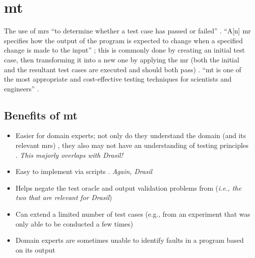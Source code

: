 \section[Metamorphic Testing (MT)]{\acf{mt}}
\label{chap:testing:sec:metamorphic-testing}
The use of \acfp{mr} ``to determine whether a test case has passed or failed''
\citep[p.~67]{KanewalaAndYuehChen2019}. ``A[n] \acs{mr} specifies how the
output of the program is expected to change when a specified change is made to
the input'' \citep[p.~67]{KanewalaAndYuehChen2019}; this is commonly done by
creating an initial test case, then transforming it into a new one by applying
the \acs{mr} (both the initial and the resultant test cases are executed and
should both pass) \citep[p.~68]{KanewalaAndYuehChen2019}. ``\acs{mt} is one of
the most appropriate and cost-effective testing techniques for scientists and
engineers'' \citep[p.~72]{KanewalaAndYuehChen2019}.

\subsection[Benefits of MT]{Benefits of \acs{mt}}
\begin{itemize}
    \item Easier for domain experts; not only do they understand the domain
          (and its relevant \acp{mr}) \citep[p.~70]{KanewalaAndYuehChen2019},
          they also may not have an understanding of testing principles
          \citep[p.~69]{KanewalaAndYuehChen2019}. \emph{This majorly
              overlaps with Drasil!}
    \item Easy to implement via scripts \citep[p.~69]{KanewalaAndYuehChen2019}.
          \emph{Again, Drasil}
    \item Helps negate the test oracle \citep[p.~69]{KanewalaAndYuehChen2019}
          and output validation \citep[p.~70]{KanewalaAndYuehChen2019} problems
          from  (\emph{i.e.,
              the two that are relevant for Drasil})
    \item Can extend a limited number of test cases (e.g., from an
          experiment that was only able to be conducted a few times)
          \citep[pp.~70-72]{KanewalaAndYuehChen2019}
    \item Domain experts are sometimes unable to identify faults in a program
          based on its output \citep[p.~71]{KanewalaAndYuehChen2019}
\end{itemize}

